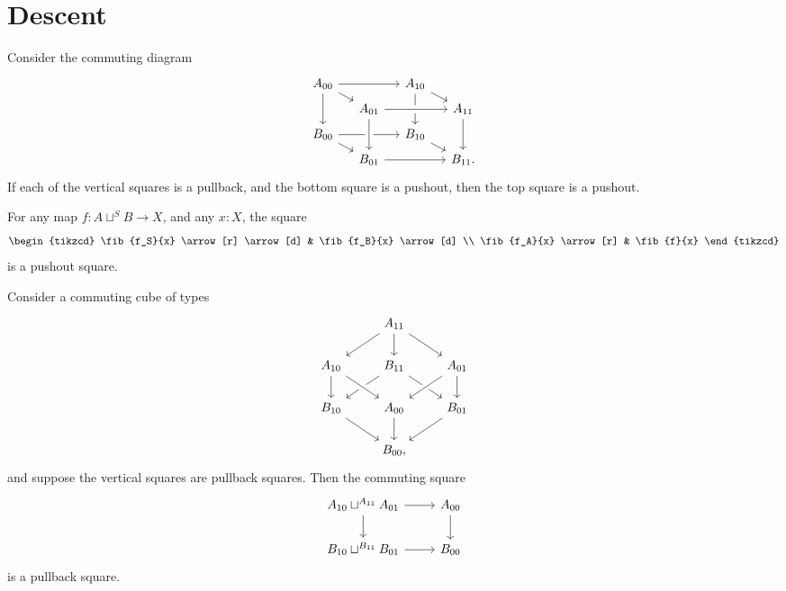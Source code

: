 \chapter{Descent}

\begin{thm}
Consider the commuting diagram
\begin{equation*}
\begin{tikzcd}[column sep=small,row sep=tiny]
A_{00} \arrow[rr] \arrow[dr] \arrow[dd] & & A_{10} \arrow[dd] \arrow[dr] \\
& A_{01} \arrow[rr,crossing over] & & A_{11} \arrow[dd] \\
B_{00} \arrow[rr] \arrow[dr] & & B_{10} \arrow[dr] \\
& B_{01} \arrow[from=uu,crossing over] \arrow[rr] & & B_{11}.
\end{tikzcd}
\end{equation*}
If each of the vertical squares is a pullback, and the bottom square  is a pushout, then the top square is a pushout.
\end{thm}

\begin{cor}
For any map $f:A\sqcup^S B\to X$, and any $x:X$, the square
\begin{equation*}
\begin{tikzcd}
\fib{f_S}{x} \arrow[r] \arrow[d] & \fib{f_B}{x} \arrow[d] \\
\fib{f_A}{x} \arrow[r] & \fib{f}{x}
\end{tikzcd}
\end{equation*}
is a pushout square.
\end{cor}

\begin{thm}
Consider a commuting cube of types 
\begin{equation}\label{eq:cube}
\begin{tikzcd}
& A_{11} \arrow[dl] \arrow[dr] \arrow[d] \\
A_{10} \arrow[d] & B_{11} \arrow[dl] \arrow[dr] & A_{01} \arrow[dl,crossing over] \arrow[d] \\
B_{10} \arrow[dr] & A_{00} \arrow[d] \arrow[from=ul,crossing over] & B_{01} \arrow[dl] \\
& B_{00},
\end{tikzcd}
\end{equation}
and suppose the vertical squares are pullback squares. Then the commuting square
\begin{equation*}
\begin{tikzcd}
A_{10}\sqcup^{A_{11}} A_{01} \arrow[r] \arrow[d] & A_{00} \arrow[d] \\
B_{10}\sqcup^{B_{11}} B_{01} \arrow[r] & B_{00}
\end{tikzcd}
\end{equation*}
is a pullback square.
\end{thm}

